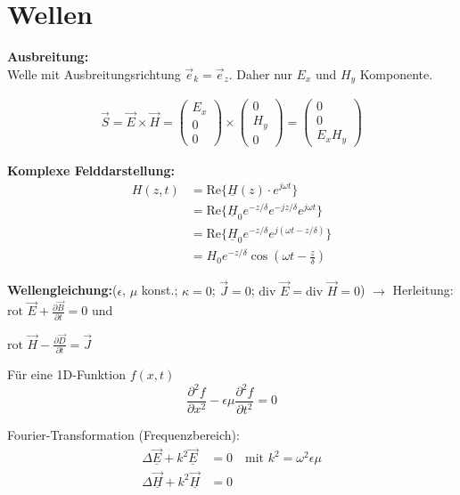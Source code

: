 \section{Wellen}

\textbf{Ausbreitung:}\\
Welle mit Ausbreitungsrichtung $\vec{e}_k = \vec{e}_z$. Daher nur $E_x$ und $H_y$ Komponente.

\begin{align}
\vec{S} = \vec{E} \times \vec{H} = \begin{pmatrix} E_x \\ 0 \\ 0 \end{pmatrix} \times \begin{pmatrix} 0 \\ H_y \\ 0 \end{pmatrix} = \begin{pmatrix} 0 \\ 0 \\ E_x H_y \end{pmatrix}
\end{align}


\textbf{Komplexe Felddarstellung:}
\begin{align}
H(z,t) &= \text{Re}\{\underline{H}(z) \cdot e^{j\omega t}\} \\
&= \text{Re}\{\underline{H}_0 e^{-z/\delta} e^{-jz/\delta} e^{j\omega t}\} \\
&= \text{Re}\{\underline{H}_0 e^{-z/\delta} e^{j(\omega t - z/\delta)}\} \\
&= H_0 e^{-z/\delta} \cos\left(\omega t - \frac{z}{\delta}\right)
\end{align}


\textbf{Wellengleichung:}($\epsilon$, $\mu$ konst.; $\kappa = 0$; $\vec{J} = 0$; $\text{div } \vec{E} = \text{div } \vec{H} = 0$) \hfill $\rightarrow$ Herleitung: $\text{rot } \vec{E} + \frac{\partial \vec{B}}{\partial t} = 0$ und
\begin{flushright}
\phantom{$\rightarrow$ Herleitung: }$\text{rot } \vec{H} - \frac{\partial \vec{D}}{\partial t} = \vec{J}$
\end{flushright}
Für eine 1D-Funktion $f(x,t)$
\begin{equation}
\frac{\partial^2 f}{\partial x^2} - \epsilon\mu \frac{\partial^2 f}{\partial t^2} = 0
\end{equation}

Fourier-Transformation (Frequenzbereich):
\begin{align}
\Delta \underline{\vec{E}} + k^2 \underline{\vec{E}} &= 0 \quad \text{mit } k^2 = \omega^2\epsilon\mu\\
\Delta \underline{\vec{H}} + k^2 \underline{\vec{H}} &= 0
\end{align}


